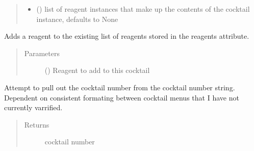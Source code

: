 \documentclass[letterpaper,10pt,english]{sphinxmanual}
\begin{document}
\begin{fulllineitems}
\begin{quote}
\begin{description}
\begin{itemize}
\item {} 
 ({\hyperref[\detokenize{polo.crystallography:polo.crystallography.cocktail.Reagent}]{}}\sphinxstyleliteralemphasis{\sphinxupquote{, }}) \textendash{} list of reagent instances that make up the contents         of the cocktail instance, defaults to None

\end{itemize}

\end{description}\end{quote}

\begin{fulllineitems}
\label{\detokenize{polo.crystallography:polo.crystallography.cocktail.Cocktail.add_reagent}}
Adds a reagent to the existing list of reagents stored in the
reagents attribute.
\begin{quote}\begin{description}
\item[{Parameters}] \leavevmode
{} ({\hyperref[\detokenize{polo.crystallography:polo.crystallography.cocktail.Reagent}]{}}) \textendash{} Reagent to add to this cocktail

\end{description}\end{quote}

\end{fulllineitems}


\begin{fulllineitems}
\label{\detokenize{polo.crystallography:polo.crystallography.cocktail.Cocktail.cocktail_index}}
Attempt to pull out the cocktail number from the cocktail number
string. Dependent on consistent formating between cocktail menus that
I have not currently varrified.
\begin{quote}\begin{description}
\item[{Returns}] \leavevmode
cocktail number


\end{description}
\end{quote}
\end{fulllineitems}
\end{fulllineitems}
\end{document}
